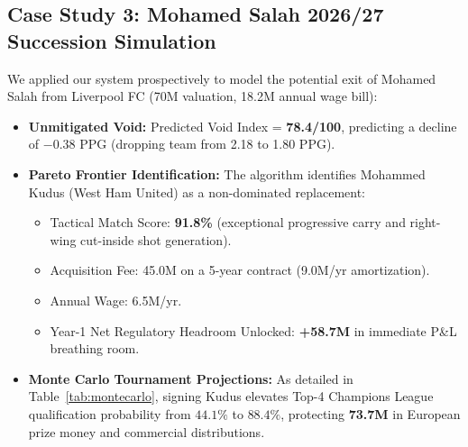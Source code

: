\documentclass[10pt,journal,compsoc]{IEEEtran}
\begin{document}
\subsection{Case Study 3: Mohamed Salah 2026/27 Succession Simulation}
We applied our system prospectively to model the potential exit of Mohamed Salah from Liverpool FC (\texteuro70M valuation, \texteuro18.2M annual wage bill):
\begin{itemize}
    \item \textbf{Unmitigated Void:} Predicted Void Index = \textbf{78.4/100}, predicting a decline of $-0.38\text{ PPG}$ (dropping team from 2.18 to 1.80 PPG).
    \item \textbf{Pareto Frontier Identification:} The algorithm identifies Mohammed Kudus (West Ham United) as a non-dominated replacement:
    \begin{itemize}
        \item Tactical Match Score: \textbf{91.8\%} (exceptional progressive carry and right-wing cut-inside shot generation).
        \item Acquisition Fee: \texteuro45.0M on a 5-year contract (\texteuro9.0M/yr amortization).
        \item Annual Wage: \texteuro6.5M/yr.
        \item Year-1 Net Regulatory Headroom Unlocked: \textbf{+\texteuro58.7M} in immediate P\&L breathing room.
    \end{itemize}
    \item \textbf{Monte Carlo Tournament Projections:}
    As detailed in Table~\ref{tab:montecarlo}, signing Kudus elevates Top-4 Champions League qualification probability from $44.1\%$ to $88.4\%$, protecting \textbf{\texteuro73.7M} in European prize money and commercial distributions.
\end{itemize}

\begin{table}[htbp]
\caption{10,000-Iteration Monte Carlo Simulation: Mohamed Salah Scenario}
\label{tab:montecarlo}
\centering
{}
\end{table}
\end{document}
